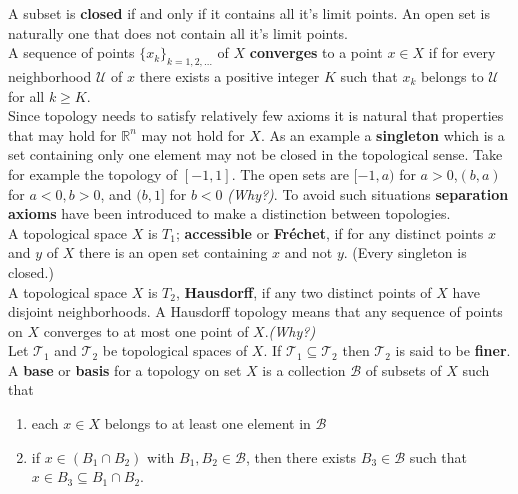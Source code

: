 \documentclass[a4paper]{article}
\begin{document}
\noindent A subset is \textbf{closed} if and only if it contains all it's limit points. An open set is naturally one that does not contain all it's limit points.\\

\noindent A sequence of points $\{x_{k}\}_{k=1,2,\ldots}$ of $X$ \textbf{converges} to a point $x\in X$ if for every neighborhood $\mathcal{U}$ of $x$ there exists a positive integer $K$ such that $x_{k}$ belongs to $\mathcal{U}$ for all $k\geq K$.\\

\noindent Since topology needs to satisfy relatively few axioms it is natural that properties that may hold for $\mathbb{R}^{n}$ may not hold for $X$. As an example a \textbf{singleton} which is a set containing only one element may not be closed in the topological sense. Take for example the topology of $[-1,1]$. The open sets are $[-1, a)$ for $a > 0$,$(b,a)$ for $a < 0, b > 0$, and  $(b, 1]$ for $b < 0$ \textit{(Why?)}. To avoid such situations \textbf{separation axioms} have been introduced to make a distinction between topologies.\\

\noindent A topological space $X$ is $T_{1}$; \textbf{accessible} or \textbf{Fr\'{e}chet}, if for any distinct points $x$ and $y$ of $X$ there is an open set containing $x$ and not $y$. (Every singleton is closed.)\\

\noindent A topological space $X$ is $T_{2}$, \textbf{Hausdorff}, if any two distinct points of $X$ have disjoint neighborhoods. A Hausdorff topology means that any sequence of points on $X$ converges to at most one point of $X$.\textit{(Why?)}\\

\noindent Let $\mathcal{T}_{1}$ and $\mathcal{T}_{2}$ be topological spaces of $X$. If $\mathcal{T}_{1}\subseteq\mathcal{T}_{2}$ then $\mathcal{T}_{2}$ is said to be \textbf{finer}.\\

\newpage
\noindent A \textbf{base} or \textbf{basis} for a topology on set $X$ is a collection $\mathcal{B}$ of subsets of $X$ such that
\begin{enumerate}
\item each $x\in X$ belongs to at least one element in $\mathcal{B}$
\item if $x\in(B_{1}\cap B_{2})$ with $B_{1},B_{2}\in\mathcal{B}$, then there exists $B_{3}\in\mathcal{B}$ such that $x\in B_{3}\subseteq B_{1}\cap B_{2}$.
\end{enumerate}
\end{document}
